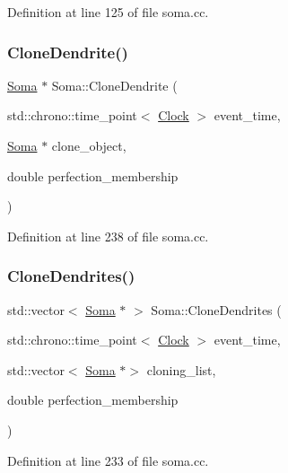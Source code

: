Definition at line 125 of file soma.\+cc.

\mbox{\label{class_soma_ad51c97b76dd7a1f77dc987ae33fd89bc}} 
\subsubsection{\texorpdfstring{Clone\+Dendrite()}{CloneDendrite()}}
{\footnotesize\ttfamily \mbox{\hyperlink{class_soma}{Soma}} $\ast$ Soma\+::\+Clone\+Dendrite (\begin{DoxyParamCaption}\item[{std\+::chrono\+::time\+\_\+point$<$ \mbox{\hyperlink{universe_8h_a0ef8d951d1ca5ab3cfaf7ab4c7a6fd80}{Clock}} $>$}]{event\+\_\+time,  }\item[{\mbox{\hyperlink{class_soma}{Soma}} $\ast$}]{clone\+\_\+object,  }\item[{double}]{perfection\+\_\+membership }\end{DoxyParamCaption})}



Definition at line 238 of file soma.\+cc.

\mbox{\label{class_soma_a3975212d2e3d8675ca14fbc9879e5e54}} 
\subsubsection{\texorpdfstring{Clone\+Dendrites()}{CloneDendrites()}}
{\footnotesize\ttfamily std\+::vector$<$ \mbox{\hyperlink{class_soma}{Soma}} $\ast$ $>$ Soma\+::\+Clone\+Dendrites (\begin{DoxyParamCaption}\item[{std\+::chrono\+::time\+\_\+point$<$ \mbox{\hyperlink{universe_8h_a0ef8d951d1ca5ab3cfaf7ab4c7a6fd80}{Clock}} $>$}]{event\+\_\+time,  }\item[{std\+::vector$<$ \mbox{\hyperlink{class_soma}{Soma}} $\ast$$>$}]{cloning\+\_\+list,  }\item[{double}]{perfection\+\_\+membership }\end{DoxyParamCaption})}



Definition at line 233 of file soma.\+cc.

\mbox{\label{class_soma_a42289635de3cb326bceeb5358b99c190}} 
